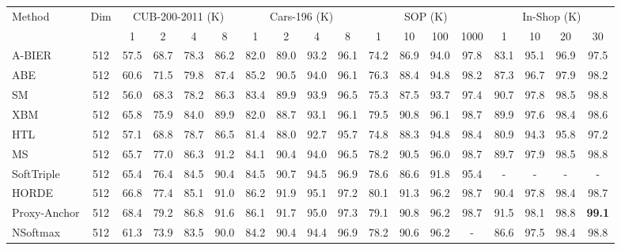 \documentclass[10pt,twocolumn,letterpaper]{article}
\begin{document}
\setlength{\tabcolsep}{0.35em}
\begin{table*}
  \centering
  \begin{tabular}{l|c|cccc|cccc|cccc|cccc}
    \toprule
    \multirow{2}{*}{Method} &
    \multirow{2}{*}{Dim} &
    \multicolumn{4}{c|}{CUB-200-2011 (K)} &
    \multicolumn{4}{c|}{Cars-196 (K)} &
    \multicolumn{4}{c|}{SOP (K)} &
    \multicolumn{4}{c}{In-Shop (K)} \\
    & &
    1 & 2 & 4 & 8 &
    1 & 2 & 4 & 8 &
    1 & 10 & 100 & 1000 &
    1 & 10 & 20 & 30 \\
    \midrule
    A-BIER \cite{A_BIER} & 512 &
    57.5 & 68.7 & 78.3 & 86.2 &
    82.0 & 89.0 & 93.2 & 96.1 &
    74.2 & 86.9 & 94.0 & 97.8 &
    83.1 & 95.1 & 96.9 & 97.5 \\
    ABE \cite{ABE} & 512 &
    60.6 & 71.5 & 79.8 & 87.4 &
    85.2 & 90.5 & 94.0 & 96.1 &
    76.3 & 88.4 & 94.8 & 98.2 &
    87.3 & 96.7 & 97.9 & 98.2 \\
    SM \cite{SM} & 512 &
    56.0 & 68.3 & 78.2 & 86.3 &
    83.4 & 89.9 & 93.9 & 96.5 &
    75.3 & 87.5 & 93.7 & 97.4 &
    90.7 & 97.8 & 98.5 & 98.8 \\
    XBM \cite{XBM} & 512 &
    65.8 & 75.9 & 84.0 & 89.9 &
    82.0 & 88.7 & 93.1 & 96.1  &
    79.5 & 90.8 & 96.1 & 98.7 &
    89.9 & 97.6 & 98.4 & 98.6 \\
    HTL \cite{HTL} & 512 &
    57.1 & 68.8 & 78.7 & 86.5 &
    81.4 & 88.0 & 92.7 & 95.7 &
    74.8 & 88.3 & 94.8 & 98.4 &
    80.9 & 94.3 & 95.8 & 97.2 \\
    MS \cite{MS} & 512 &
    65.7 & 77.0 & 86.3 & 91.2 &
    84.1 & 90.4 & 94.0 & 96.5 &
    78.2 & 90.5 & 96.0 & 98.7 &
    89.7 & 97.9 & 98.5 & 98.8 \\
    SoftTriple \cite{softtriple} & 512 &
    65.4 & 76.4 & 84.5 & 90.4 &
    84.5 & 90.7 & 94.5 & 96.9 &
    78.6 & 86.6 & 91.8 & 95.4 &
    - & - & - & - \\
    HORDE \cite{HORDE} & 512 &
    66.8 & 77.4 & 85.1 & 91.0 &
    86.2 & 91.9 & 95.1 & 97.2 &
    80.1 & 91.3 & 96.2 & 98.7 &
    90.4 & 97.8 & 98.4 & 98.7 \\
    Proxy-Anchor \cite{proxy_anchor} & 512 &
    68.4 & 79.2 & 86.8 & 91.6 &
    86.1 & 91.7 & 95.0 & 97.3 &
    79.1 & 90.8 & 96.2 & 98.7 &
    91.5 & 98.1 & 98.8 & {\bf 99.1} \\
    NSoftmax \cite{NSoftmax} & 512 &
    61.3 & 73.9 & 83.5 & 90.0 &
    84.2 & 90.4 & 94.4 & 96.9 &
    78.2 & 90.6 & 96.2 & - & 
    86.6 & 97.5 & 98.4 & 98.8 \\

\end{tabular}
\end{table*}
\end{document}
